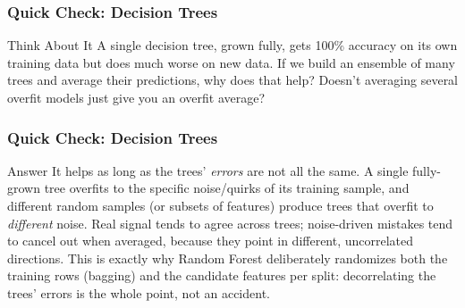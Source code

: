 \begin{frame}[fragile]\frametitle{Quick Check: Decision Trees}
\begin{block}{Think About It}
A single decision tree, grown fully, gets 100\% accuracy on its own training data but does much worse on new data. If we build an ensemble of many trees and average their predictions, why does that help? Doesn't averaging several overfit models just give you an overfit average?
\end{block}
\end{frame}

\begin{frame}[fragile]\frametitle{Quick Check: Decision Trees}
\begin{block}{Answer}
It helps as long as the trees' \emph{errors} are not all the same. A single fully-grown tree overfits to the specific noise/quirks of its training sample, and different random samples (or subsets of features) produce trees that overfit to \emph{different} noise. Real signal tends to agree across trees; noise-driven mistakes tend to cancel out when averaged, because they point in different, uncorrelated directions. This is exactly why Random Forest deliberately randomizes both the training rows (bagging) and the candidate features per split: decorrelating the trees' errors is the whole point, not an accident.
\end{block}
\end{frame}

